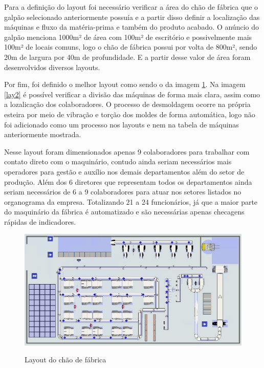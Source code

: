 \documentclass[
	12pt,				%
	openright,			%
	oneside,			%
	a4paper,			%
	english,			%
	french,				%
	spanish,			%
	brazil				%
	]{abntex2}
\begin{document}
Para a definição do layout foi necessário verificar a área do chão de fábrica que o galpão selecionado anteriormente possuía e a partir disso definir a localização das máquinas e fluxo da matéria-prima e também do produto acabado. O anúncio do galpão menciona 1000m² de área com 100m² de escritório e possivelmente mais 100m² de locais comuns, logo o chão de fábrica possui por volta de 800m², sendo 20m de largura por 40m de profundidade. E a partir desse valor de área foram desenvolvidos diversos layouts.

Por fim, foi definido o melhor layout como sendo o da imagem \ref{lay1}. Na imagem \ref{lay2} é possível verificar a divisão das máquinas de forma mais clara, assim como a lozalicação dos colaboradores. O processo de desmoldagem ocorre na própria esteira por meio de vibração e torção dos moldes de forma automática, logo não foi adicionado como um processo nos layouts e nem na tabela de máquinas anteriormente mostrada.

Nesse layout foram dimensionados apenas 9 colaboradores para trabalhar com contato direto com o maquinário, contudo ainda seriam necessários mais operadores para gestão e auxílio nos demais departamentos além do setor de produção. Além dos 6 diretores que representam todos os departamentos ainda seriam necessários de 6 a 9 colaboradores para atuar nos setores listados no organograma da empresa. Totalizando 21 a 24 funcionários, já que a maior parte do maquinário da fábrica é automatizado e são necessárias apenas checagens rápidas de indicadores.

\begin{figure}[H]
\begin{center}
\caption{Layout do chão de fábrica}
\includegraphics[scale=0.4]{../../Pictures/WhatsApp Image 2022-09-17 at 14.55.23.jpeg} 
\label{lay1}
\end{center}
\end{figure}
\end{document}
